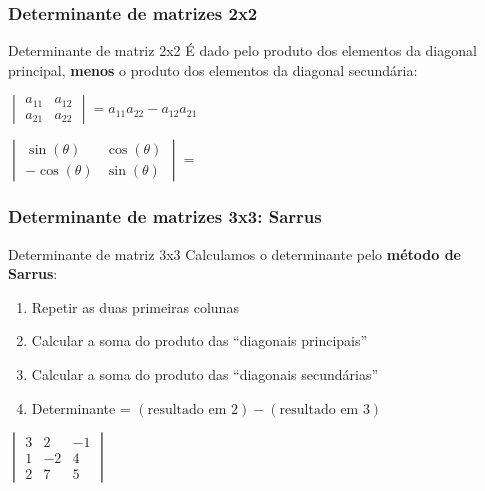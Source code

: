\documentclass[pdftex, brazil]{beamer}
\begin{document}
\begin{frame}[t]
  \frametitle{Determinante de matrizes 2x2}
  \begin{block}{Determinante de matriz 2x2}
    É dado pelo produto dos elementos da diagonal principal, \textbf{menos} o
    produto dos elementos da diagonal secundária:
    \begin{center}
    $\begin{vmatrix}
      a_{11} & a_{12}\\
      a_{21} & a_{22}\end{vmatrix} = a_{11}a_{22} - a_{12}a_{21}$
    \end{center}
  \end{block}
  $\begin{vmatrix}
    \sin{(\theta)} & \cos{(\theta)}\\
    -\cos{(\theta)} & \sin{(\theta)}\end{vmatrix} =$
\end{frame}

\begin{frame}[t]
  \frametitle{Determinante de matrizes 3x3: Sarrus}
  \begin{block}{Determinante de matriz 3x3}
    Calculamos o determinante pelo \textbf{método de Sarrus}:
    \begin{enumerate}
      \item Repetir as duas primeiras colunas
      \item Calcular a soma do produto das ``diagonais principais''
      \item Calcular a soma do produto das ``diagonais secundárias''
      \item Determinante = $(\text{resultado em } 2) - (\text{resultado em } 3)$
    \end{enumerate}
  \end{block}
  $\begin{vmatrix}
    3 & 2 & -1\\
    1 & -2 & 4\\
    2 & 7 & 5\end{vmatrix}$
\end{frame}
\end{document}
